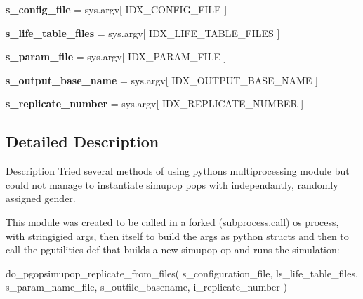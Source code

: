 \begin{DoxyCompactItemize}
\item 
{\bfseries s\+\_\+config\+\_\+file} = sys.\+argv\mbox{[} I\+D\+X\+\_\+\+C\+O\+N\+F\+I\+G\+\_\+\+F\+I\+LE \mbox{]}\hypertarget{namespacenegui_1_1do__sim__replicate_ab98a19e7f029f27689ef8144593788e3}{}\label{namespacenegui_1_1do__sim__replicate_ab98a19e7f029f27689ef8144593788e3}

\item 
{\bfseries s\+\_\+life\+\_\+table\+\_\+files} = sys.\+argv\mbox{[} I\+D\+X\+\_\+\+L\+I\+F\+E\+\_\+\+T\+A\+B\+L\+E\+\_\+\+F\+I\+L\+ES \mbox{]}\hypertarget{namespacenegui_1_1do__sim__replicate_a13ef954bb6d23716134bc7743b53b082}{}\label{namespacenegui_1_1do__sim__replicate_a13ef954bb6d23716134bc7743b53b082}

\item 
{\bfseries s\+\_\+param\+\_\+file} = sys.\+argv\mbox{[} I\+D\+X\+\_\+\+P\+A\+R\+A\+M\+\_\+\+F\+I\+LE \mbox{]}\hypertarget{namespacenegui_1_1do__sim__replicate_ae113b16a4487c7e22b2e3d6236a109d7}{}\label{namespacenegui_1_1do__sim__replicate_ae113b16a4487c7e22b2e3d6236a109d7}

\item 
{\bfseries s\+\_\+output\+\_\+base\+\_\+name} = sys.\+argv\mbox{[} I\+D\+X\+\_\+\+O\+U\+T\+P\+U\+T\+\_\+\+B\+A\+S\+E\+\_\+\+N\+A\+ME \mbox{]}\hypertarget{namespacenegui_1_1do__sim__replicate_a88bb8b911f5810aea7c8e15c74a88837}{}\label{namespacenegui_1_1do__sim__replicate_a88bb8b911f5810aea7c8e15c74a88837}

\item 
{\bfseries s\+\_\+replicate\+\_\+number} = sys.\+argv\mbox{[} I\+D\+X\+\_\+\+R\+E\+P\+L\+I\+C\+A\+T\+E\+\_\+\+N\+U\+M\+B\+ER \mbox{]}\hypertarget{namespacenegui_1_1do__sim__replicate_a3260266f3430ed738305b1280c7c5625}{}\label{namespacenegui_1_1do__sim__replicate_a3260266f3430ed738305b1280c7c5625}

\end{DoxyCompactItemize}


\subsection{Detailed Description}
\begin{DoxyVerb}Description
Tried several methods of using pythons multiprocessing module but could not
manage to instantiate simupop pops with independantly, randomly assigned gender.

This module was created to be called in a forked (subprocess.call)  os process,
 with stringigied args, then itself to build the args as 
 python structs and then to call the pgutilities def that builds a new simupop op 
 and runs the simulation:

            do_pgopsimupop_replicate_from_files(  s_configuration_file, 
                                            ls_life_table_files, 
                                            s_param_name_file, 
                                            s_outfile_basename, 
                                            i_replicate_number )\end{DoxyVerb}
 

